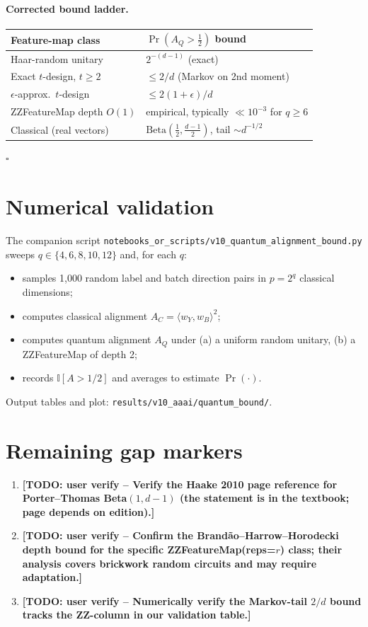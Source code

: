 \documentclass[11pt,a4paper]{article}
\newcommand{\TODO}[1]{\textbf{[TODO: user verify -- #1]}}
\begin{document}
\paragraph{Corrected bound ladder.}
\begin{center}
\begin{tabular}{ll}
\toprule
Feature-map class & $\Pr(A_Q>\tfrac12)$ bound \\
\midrule
Haar-random unitary               & $2^{-(d-1)}$ (exact) \\
Exact $t$-design, $t\ge 2$        & $\le 2/d$  (Markov on 2nd moment) \\
$\epsilon$-approx.\ $t$-design    & $\le 2(1+\epsilon)/d$ \\
ZZFeatureMap depth $O(1)$         & empirical, typically $\ll 10^{-3}$ for $q\ge 6$ \\
Classical (real vectors)          & $\mathrm{Beta}(\tfrac12,\tfrac{d-1}{2})$, tail $\sim d^{-1/2}$ \\
\bottomrule
\end{tabular}
\end{center}

\hfill$\square$

\section{Numerical validation}

The companion script
\texttt{notebooks\_or\_scripts/v10\_quantum\_alignment\_bound.py}
sweeps $q\in\{4,6,8,10,12\}$ and, for each $q$:
\begin{itemize}
\item samples 1{,}000 random label and batch direction pairs in
  $p=2^{q}$ classical dimensions;
\item computes classical alignment $A_C=\langle w_Y,w_B\rangle^{2}$;
\item computes quantum alignment $A_Q$ under (a) a uniform random
  unitary, (b) a ZZFeatureMap of depth 2;
\item records $\mathbb{I}[A>1/2]$ and averages to estimate
  $\Pr(\cdot)$.
\end{itemize}
Output tables and plot: \texttt{results/v10\_aaai/quantum\_bound/}.

\section{Remaining gap markers}

\begin{enumerate}
\item \TODO{Verify the Haake 2010 page reference for Porter--Thomas
  Beta$(1,d-1)$ (the statement is in the textbook; page depends on
  edition).}
\item \TODO{Confirm the Brand\~ao--Harrow--Horodecki depth bound for
  the specific ZZFeatureMap(reps=$r$) class; their analysis covers
  brickwork random circuits and may require adaptation.}
\item \TODO{Numerically verify the Markov-tail $2/d$ bound tracks the
  ZZ-column in our validation table.}
\end{enumerate}
\end{document}
